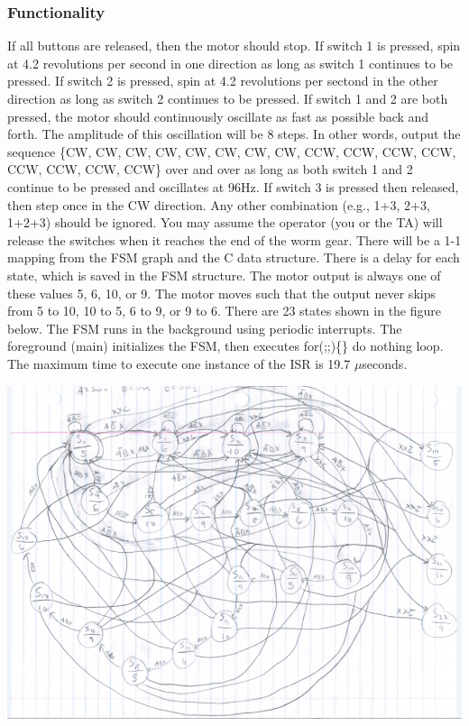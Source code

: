 \documentclass[twoside]{article}
\begin{document}
\subsubsection*{Functionality}
If all buttons are released, then the motor should stop. If switch 1 is pressed, spin at 4.2 revolutions per second in one direction as long as switch 1 continues to be pressed. If switch 2 is pressed, spin at 4.2 revolutions per sectond in the other direction as long as switch 2 continues to be pressed. If switch 1 and 2 are both pressed, the motor should continuously oscillate as fast as possible back and forth. The amplitude of this oscillation will be 8 steps. In other words, output the sequence \{CW, CW, CW, CW, CW, CW, CW, CW, CCW, CCW, CCW, CCW, CCW, CCW, CCW, CCW\} over and over as long as both switch 1 and 2 continue to be pressed and oscillates at 96Hz. If switch 3 is pressed then released, then step once in the CW direction. Any other combination (e.g., 1+3, 2+3, 1+2+3) should be ignored. You may assume the operator (you or the TA) will release the switches when it reaches the end of the worm gear. There will be a 1-1 mapping from the FSM graph and the C data structure. There is a delay for each state, which is saved in the FSM structure. The motor output is always one of these values 5, 6, 10, or 9. The motor moves such that the output never skips from 5 to 10, 10 to 5, 6 to 9, or 9 to 6. There are 23 states shown in the figure below. The FSM runs in the background using periodic interrupts. The foreground (main) initializes the FSM, then executes for(;;)\{\} do nothing loop. The maximum time to execute one instance of the ISR is 19.7 $\mu$seconds.
\vskip 0.1in
\centerline{\includegraphics[width=\textwidth]{FSM_compress}}
\end{document}
